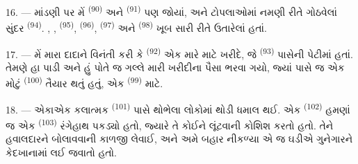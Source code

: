 16. --- માંડણી પર મેં  \textsuperscript{(90)} અને
 \textsuperscript{(91)} પણ જોયાં, અને ટોપલાઓમાં
નમણી રીતે ગોઠવેલાં સુંદર  \textsuperscript{(94)}.
, , 
\textsuperscript{(95)},  \textsuperscript{(96)},
 \textsuperscript{(97)} અને 
\textsuperscript{(98)} ખૂબ સારી રીતે ઉતારેલાં હતાં.

\VUsaut{4.4mm}
\VUsaut{2.8mm}

17. --- મેં મારા દાદાને વિનંતી કરી કે 
\textsuperscript{(92)} એક મારે માટે ખરીદે, જે 
\textsuperscript{(93)} પાસેની પેટીમાં હતાં. તેમણે હા પાડી અને હું
પોતે જ ગલ્લે મારી ખરીદીના પૈસા ભરવા ગયો, જ્યાં પાસે જ એક
મોટું  \textsuperscript{(100)} તૈયાર થતું
હતું, એક  \textsuperscript{(99)} માટે.

18. --- એકાએક કલાત્મક 
\textsuperscript{(101)} પાસે થોભેલા લોકોમાં થોડી ધમાલ થઈ. એક
 \textsuperscript{(102)} હમણાં જ એક 
\textsuperscript{(103)} રંગેહાથ પકડ્યો હતો, જ્યારે તે કોઈને લૂંટવાની
કોશિશ કરતો હતો. તેને  હવાલદારને બોલાવવાની કાળજી લેવાઈ,
અને અમે બહાર નીકળ્યા એ જ ઘડીએ ગુનેગારને કેદખાનામાં લઈ જવાતો હતો.

\VUsaut{6.0mm}
\VUfilet{22mm}
